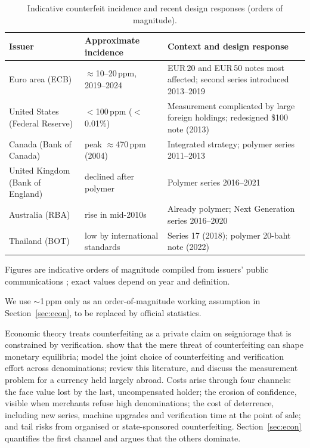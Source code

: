 \documentclass{article}
\theoremstyle{definition}
\theoremstyle{remark}
\begin{document}
\begin{table}[t]
\centering
\small
\begin{threeparttable}
\caption{Indicative counterfeit incidence and recent design responses (orders of magnitude).}
\label{tab:incidence}
\begin{tabularx}{\textwidth}{@{}l l X@{}}
\toprule
Issuer & Approximate incidence & Context and design response \\
\midrule
Euro area (ECB) & $\approx$10--20\,ppm, 2019--2024 & EUR\,20 and EUR\,50 notes most affected; second series introduced 2013--2019 \\
United States (Federal Reserve) & $<$100\,ppm ($<$0.01\%) & Measurement complicated by large foreign holdings; redesigned \$100 note (2013) \\
Canada (Bank of Canada) & peak $\approx$470\,ppm (2004) & Integrated strategy; polymer series 2011--2013 \\
United Kingdom (Bank of England) & declined after polymer & Polymer series 2016--2021 \\
Australia (RBA) & rise in mid-2010s & Already polymer; Next Generation series 2016--2020 \\
Thailand (BOT) & low by international standards\tnote{a} & Series 17 (2018); polymer 20-baht note (2022) \\
\bottomrule
\end{tabularx}
\begin{tablenotes}\footnotesize
\item Figures are indicative orders of magnitude compiled from issuers' public communications \citep{ecb_stats,fed_currency,boc_counterfeit,boe_counterfeit,rba_counterfeit,bot_banknotes}; exact values depend on year and definition. \item[a] We use $\sim$1\,ppm only as an order-of-magnitude working assumption in Section~\ref{sec:econ}, to be replaced by official statistics.
\end{tablenotes}
\end{threeparttable}
\end{table}

Economic theory treats counterfeiting as a private claim on seigniorage that is constrained by verification. \citet{nosal2007model} show that the mere threat of counterfeiting can shape monetary equilibria; \citet{quercioli2015economics} model the joint choice of counterfeiting and verification effort across denominations; \citet{fung2011modelling} review this literature, and \citet{judson2003estimating} discuss the measurement problem for a currency held largely abroad. Costs arise through four channels: the face value lost by the last, uncompensated holder; the erosion of confidence, visible when merchants refuse high denominations; the cost of deterrence, including new series, machine upgrades and verification time at the point of sale; and tail risks from organised or state-sponsored counterfeiting. Section~\ref{sec:econ} quantifies the first channel and argues that the others dominate.
\end{document}

